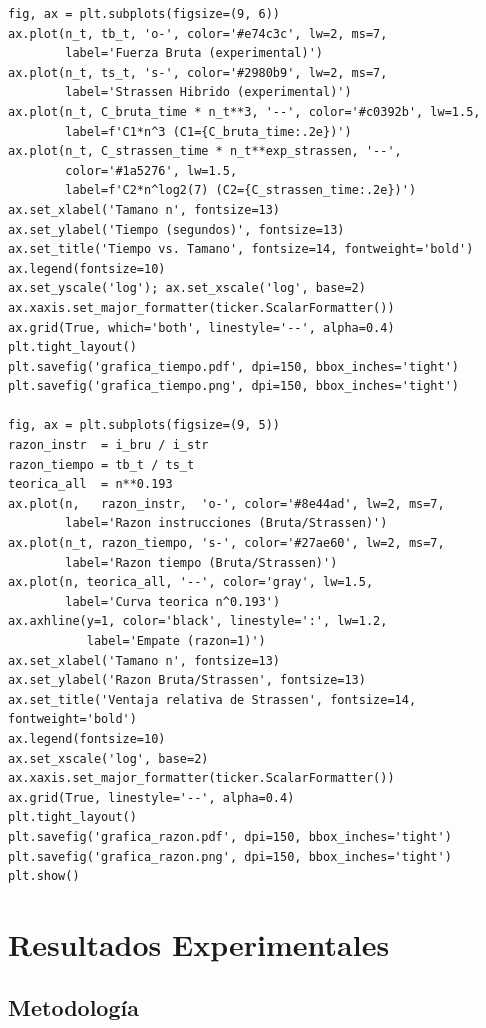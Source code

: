 \documentclass[12pt,a4paper]{article}
\begin{document}
\begin{lstlisting}[style=pystyle,
    caption={C\'odigo completo de \texttt{graficar.py}},
    label={lst:graficar}]
fig, ax = plt.subplots(figsize=(9, 6))
ax.plot(n_t, tb_t, 'o-', color='#e74c3c', lw=2, ms=7,
        label='Fuerza Bruta (experimental)')
ax.plot(n_t, ts_t, 's-', color='#2980b9', lw=2, ms=7,
        label='Strassen Hibrido (experimental)')
ax.plot(n_t, C_bruta_time * n_t**3, '--', color='#c0392b', lw=1.5,
        label=f'C1*n^3 (C1={C_bruta_time:.2e})')
ax.plot(n_t, C_strassen_time * n_t**exp_strassen, '--',
        color='#1a5276', lw=1.5,
        label=f'C2*n^log2(7) (C2={C_strassen_time:.2e})')
ax.set_xlabel('Tamano n', fontsize=13)
ax.set_ylabel('Tiempo (segundos)', fontsize=13)
ax.set_title('Tiempo vs. Tamano', fontsize=14, fontweight='bold')
ax.legend(fontsize=10)
ax.set_yscale('log'); ax.set_xscale('log', base=2)
ax.xaxis.set_major_formatter(ticker.ScalarFormatter())
ax.grid(True, which='both', linestyle='--', alpha=0.4)
plt.tight_layout()
plt.savefig('grafica_tiempo.pdf', dpi=150, bbox_inches='tight')
plt.savefig('grafica_tiempo.png', dpi=150, bbox_inches='tight')

fig, ax = plt.subplots(figsize=(9, 5))
razon_instr  = i_bru / i_str
razon_tiempo = tb_t / ts_t
teorica_all  = n**0.193
ax.plot(n,   razon_instr,  'o-', color='#8e44ad', lw=2, ms=7,
        label='Razon instrucciones (Bruta/Strassen)')
ax.plot(n_t, razon_tiempo, 's-', color='#27ae60', lw=2, ms=7,
        label='Razon tiempo (Bruta/Strassen)')
ax.plot(n, teorica_all, '--', color='gray', lw=1.5,
        label='Curva teorica n^0.193')
ax.axhline(y=1, color='black', linestyle=':', lw=1.2,
           label='Empate (razon=1)')
ax.set_xlabel('Tamano n', fontsize=13)
ax.set_ylabel('Razon Bruta/Strassen', fontsize=13)
ax.set_title('Ventaja relativa de Strassen', fontsize=14, fontweight='bold')
ax.legend(fontsize=10)
ax.set_xscale('log', base=2)
ax.xaxis.set_major_formatter(ticker.ScalarFormatter())
ax.grid(True, linestyle='--', alpha=0.4)
plt.tight_layout()
plt.savefig('grafica_razon.pdf', dpi=150, bbox_inches='tight')
plt.savefig('grafica_razon.png', dpi=150, bbox_inches='tight')
plt.show()
\end{lstlisting}

\section{Resultados Experimentales}
\label{sec:resultados}

\subsection{Metodolog\'ia}
\end{document}
